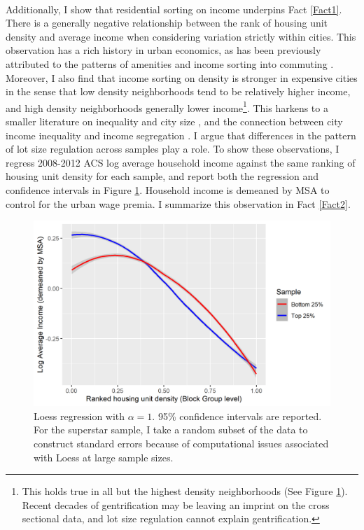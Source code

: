 \documentclass[]{article}
\begin{document}
\paragraph*{}
Additionally, I show that  residential sorting on income underpins Fact \ref{Fact1}. There is a generally negative relationship between the rank of housing unit density and average income when considering variation strictly within cities. This observation has a rich history in urban economics, as has been previously attributed to the patterns of amenities \citep{parispoor} and income sorting into commuting \citep{ccpoortransport}. Moreover, I also find that income sorting on density is stronger in expensive cities in the sense that low density neighborhoods tend to be relatively higher income, and high density neighborhoods generally lower income\footnote{This holds true in all but the highest density neighborhoods (See Figure \ref{incomesorting}). Recent decades of gentrification may be leaving an imprint on the cross sectional data, and lot size regulation cannot explain gentrification.}. This harkens to a smaller literature on inequality and city size \citep{ineqcitysize} \citep{spatialsorting}, and the connection between city income inequality and income segregation \citep{FogliGuerrieri}. I argue that differences in the pattern of lot size regulation across samples play a role. To show these observations, I regress 2008-2012 ACS log average household income against the same ranking of housing unit density for each sample, and report both the regression and confidence intervals in Figure \ref{incomesorting}. Household income is demeaned by MSA to control for the urban wage premia. I summarize this observation in Fact \ref{Fact2}.

\begin{figure}[htbp]
	\begin{center}
		\includegraphics[width=1.1\textwidth]{income.png}
		\caption{Loess regression with $\alpha = 1$. 95\% confidence intervals are reported. For the superstar sample, I take a random subset of the data to construct standard errors because of computational issues associated with Loess at large sample sizes.}\label{incomesorting}
	\end{center}
\end{figure}
\end{document}
